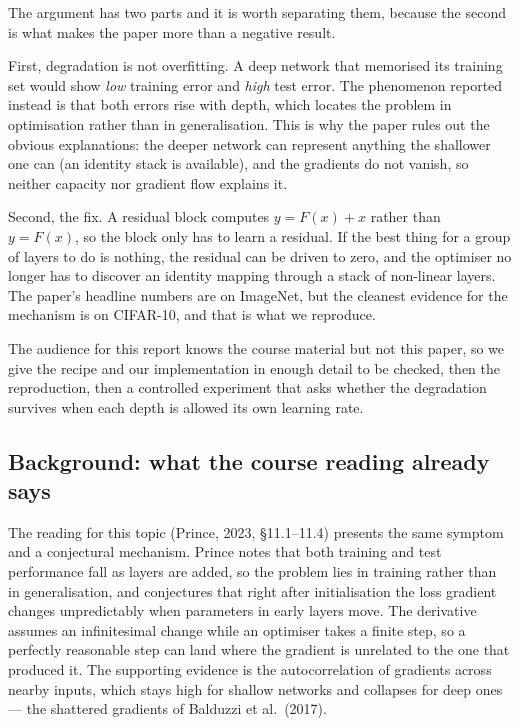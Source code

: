 \documentclass[11pt,a4paper]{article}
\begin{document}
The argument has two parts and it is worth separating them, because the second
is what makes the paper more than a negative result.

First, degradation is not overfitting. A deep network that memorised its
training set would show \emph{low} training error and \emph{high} test error.
The phenomenon reported instead is that both errors rise with depth, which
locates the problem in optimisation rather than in generalisation. This is why
the paper rules out the obvious explanations: the deeper network can represent
anything the shallower one can (an identity stack is available), and the
gradients do not vanish, so neither capacity nor gradient flow explains it.

Second, the fix. A residual block computes $y = F(x) + x$ rather than
$y = F(x)$, so the block only has to learn a residual. If the best thing for a
group of layers to do is nothing, the residual can be driven to zero, and the
optimiser no longer has to discover an identity mapping through a stack of
non-linear layers. The paper's headline numbers are on ImageNet, but the
cleanest evidence for the mechanism is on CIFAR-10, and that is what we
reproduce.

The audience for this report knows the course material but not this paper, so
we give the recipe and our implementation in enough detail to be checked, then
the reproduction, then a controlled experiment that asks whether the
degradation survives when each depth is allowed its own learning rate.

\subsection{Background: what the course reading already says}

The reading for this topic (Prince, 2023, \S11.1--11.4) presents the same
symptom and a conjectural mechanism. Prince notes that both training and test
performance fall as layers are added, so the problem lies in training rather
than in generalisation, and conjectures that right after initialisation the loss
gradient changes unpredictably when parameters in early layers move. The
derivative assumes an infinitesimal change while an optimiser takes a finite
step, so a perfectly reasonable step can land where the gradient is unrelated to
the one that produced it. The supporting evidence is the autocorrelation of
gradients across nearby inputs, which stays high for shallow networks and
collapses for deep ones --- the shattered gradients of Balduzzi et al.\ (2017).
\end{document}
